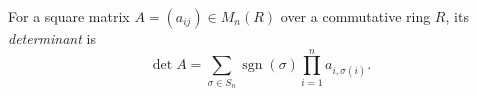 
For a square matrix $A=(a_{ij})\in M_n(R)$ over a commutative ring $R$, its \emph{determinant} is
\[
\det A=\sum_{\sigma\in S_n}\operatorname{sgn}(\sigma)\prod_{i=1}^{n} a_{i,\sigma(i)}.
\]
